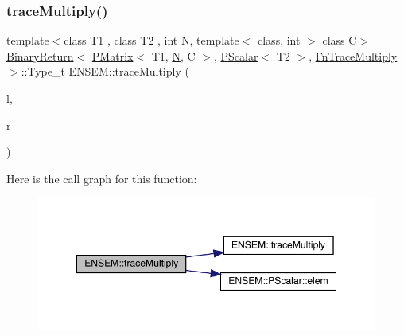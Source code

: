 \subsubsection{\texorpdfstring{traceMultiply()}{traceMultiply()}\hspace{0.1cm}{\footnotesize\ttfamily [2/3]}}
{\footnotesize\ttfamily template$<$class T1 , class T2 , int N, template$<$ class, int $>$ class C$>$ \\
\mbox{\hyperlink{structENSEM_1_1BinaryReturn}{Binary\+Return}}$<$ \mbox{\hyperlink{classENSEM_1_1PMatrix}{P\+Matrix}}$<$ T1, \mbox{\hyperlink{adat__devel_2lib_2hadron_2operator__name__util_8cc_a7722c8ecbb62d99aee7ce68b1752f337}{N}}, C $>$, \mbox{\hyperlink{classENSEM_1_1PScalar}{P\+Scalar}}$<$ T2 $>$, \mbox{\hyperlink{structENSEM_1_1FnTraceMultiply}{Fn\+Trace\+Multiply}} $>$\+::Type\+\_\+t E\+N\+S\+E\+M\+::trace\+Multiply (\begin{DoxyParamCaption}\item[{const \mbox{\hyperlink{classENSEM_1_1PMatrix}{P\+Matrix}}$<$ T1, \mbox{\hyperlink{adat__devel_2lib_2hadron_2operator__name__util_8cc_a7722c8ecbb62d99aee7ce68b1752f337}{N}}, C $>$ \&}]{l,  }\item[{const \mbox{\hyperlink{classENSEM_1_1PScalar}{P\+Scalar}}$<$ T2 $>$ \&}]{r }\end{DoxyParamCaption})\hspace{0.3cm}{\ttfamily [inline]}}

Here is the call graph for this function\+:\nopagebreak
\begin{figure}[H]
\begin{center}
\leavevmode
\includegraphics[width=349pt]{df/d0a/group__primmatrix_gac4a39563bd9c9b587bd894f97f9e3fc4_cgraph}
\end{center}
\end{figure}
\mbox{\label{group__primmatrix_ga5b0cf4c87cad1bfd7dcad0a42d0b4ae6}} 
